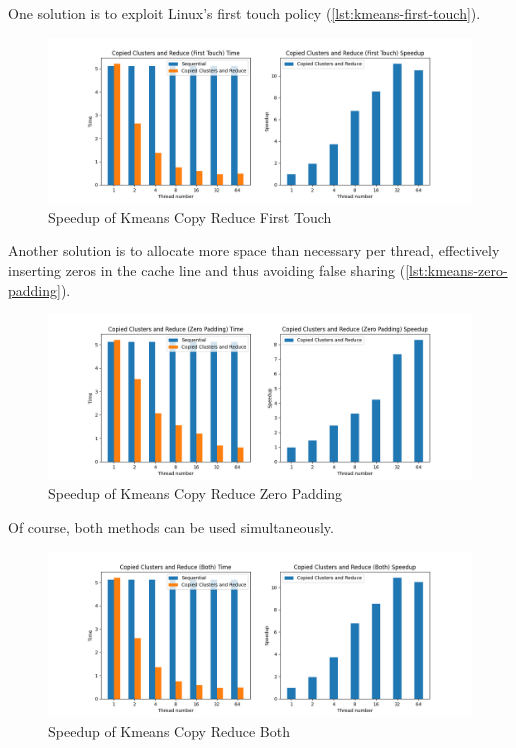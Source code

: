 \documentclass{article}
\newcommand{\eng}[1]{#1}
\begin{document}
One solution is to exploit Linux's \eng{first touch} policy (\ref{lst:kmeans-first-touch}).

\begin{figure}[h]
    \centering
    \includegraphics[width=\textwidth]{a2/plots/kmeans_copy_reduce_time_speedup_first_touch.png}
    \caption{\eng{Speedup} of \eng{Kmeans Copy Reduce First Touch}}
    \label{fig:kmeans_copy_reduce_time_speedup_first_touch}
\end{figure}

Another solution is to allocate more space than necessary per thread, effectively inserting zeros in the cache line and thus avoiding \eng{false sharing} (\ref{lst:kmeans-zero-padding}).

\begin{figure}[h]
    \centering
    \includegraphics[width=\textwidth]{a2/plots/kmeans_copy_reduce_time_speedup_zero_padding.png}
    \caption{\eng{Speedup} of \eng{Kmeans Copy Reduce Zero Padding}}
    \label{fig:kmeans_copy_reduce_time_speedup_zero_padding}
\end{figure}

Of course, both methods can be used simultaneously.

\begin{figure}[h]
    \centering
    \includegraphics[width=\textwidth]{a2/plots/kmeans_copy_reduce_time_speedup_both.png}
    \caption{\eng{Speedup} of \eng{Kmeans Copy Reduce Both}}
    \label{fig:kmeans_copy_reduce_time_speedup_both}
\end{figure}
\end{document}
